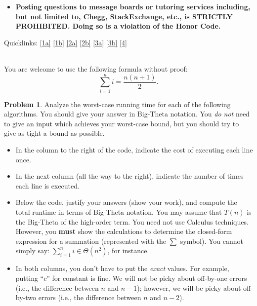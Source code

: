 \documentclass[11pt]{article}
\theoremstyle{definition}
\theoremstyle{definition}
\newtheorem{problem}{Problem}
\theoremstyle{definition}
\begin{document}
\begin{small}
\begin{itemize}
	\item \textbf{Posting questions to message boards or tutoring services including, but not limited to, Chegg, StackExchange, etc., is STRICTLY PROHIBITED. Doing so is a violation of the Honor Code.}
\end{itemize}

Quicklinks: \ref{1a} \ref{1b} \ref{2a} \ref{2b} \ref{3a} \ref{3b} \ref{4} 
\vspace{-4mm} 
\end{small}



\hrulefill
\noindent \\ You are welcome to use the following formula without proof:
\[
\sum_{i=1}^{n} i = \frac{n(n+1)}{2}.
\]

\newpage


\begin{problem}
Analyze the worst-case running time for each of the following algorithms. You should give your answer in Big-Theta notation. You \emph{do not} need to give an input which achieves your worst-case bound, but you should try to give as tight a bound as possible. 
	\begin{itemize}
	\item In the column to the right of the code, indicate the cost of executing each line once.
	
	\item In the next column (all the way to the right), indicate the number of times each line is executed.
	
	\item Below the code, justify your answers (show your work), and compute the total runtime in terms of Big-Theta notation.  You may assume that $T(n)$ is the Big-Theta of the high-order term. You need not use Calculus techniques. However, you \textbf{must} show the calculations to determine the closed-form expression for a summation (represented with the $\displaystyle \sum$ symbol). You cannot simply say: $\displaystyle \sum_{i=1}^{n} i \in \Theta(n^{2})$, for instance.
	
	\item In both columns, you don't have to put the \emph{exact} values. For example, putting ``$c$'' for constant is fine. We will not be picky about off-by-one errors (i.e., the difference between $n$ and $n-1$); however, we will be picky about off-by-two errors (i.e., the difference between $n$ and $n-2$).
    \end{itemize}
\end{problem}
\end{document}
